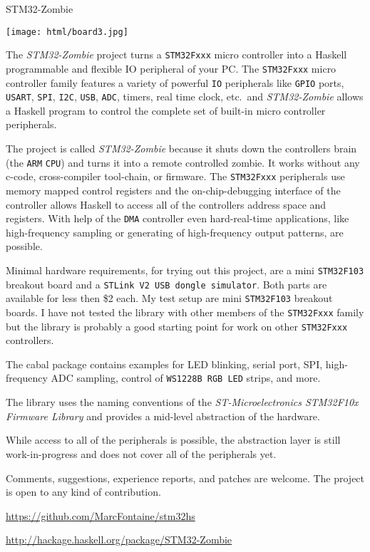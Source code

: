 \begin{hcarentry}[new]{STM32-Zombie}
\makeheader

\begin{center}
\texttt{[image: html/board3.jpg]}
\end{center}

The {\em STM32-Zombie} project turns a \texttt{STM32Fxxx} micro controller
into a Haskell programmable and flexible IO peripheral of your PC. The
\texttt{STM32Fxxx} micro controller family features a variety of powerful
\texttt{IO} peripherals like \texttt{GPIO} ports, \texttt{USART},
\texttt{SPI}, \texttt{I2C}, \texttt{USB}, \texttt{ADC}, timers, real time
clock, etc.\, and {\em STM32-Zombie} allows a Haskell program to control the
complete set of built-in micro controller peripherals.

The project is called {\em STM32-Zombie} because it shuts down the controllers
brain (the \texttt{ARM} \texttt{CPU}) and turns it into a remote controlled
zombie. It works without any c-code, cross-compiler tool-chain, or firmware.
The \texttt{STM32Fxxx} peripherals use memory mapped control registers and the
on-chip-debugging interface of the controller allows Haskell to access all of
the controllers address space and registers. With help of the \texttt{DMA}
controller even hard-real-time applications, like high-frequency sampling or
generating of high-frequency output patterns, are possible.

Minimal hardware requirements, for trying out this project, are a mini
\texttt{STM32F103} breakout board and a \texttt{STLink V2 USB dongle
simulator}. Both parts are available for less then \$2 each. My test setup are
mini \texttt{STM32F103} breakout boards. I have not tested the library with
other members of the \texttt{STM32Fxxx} family but the library is probably a
good starting point for work on other \texttt{STM32Fxxx} controllers.

The cabal package contains examples for LED blinking, serial port, SPI,
high-frequency ADC sampling, control of \texttt{WS1228B RGB LED} strips, and
more.

The library uses the naming conventions of the {\em ST-Microelectronics
STM32F10x Firmware Library} and provides a mid-level abstraction of the
hardware.

While access to all of the peripherals is possible, the abstraction layer is
still work-in-progress and does not cover all of the peripherals yet.

Comments, suggestions, experience reports, and patches are welcome. The
project is open to any kind of contribution.

\FurtherReading
  {\small
\begin{compactitem}
\item\url{https://github.com/MarcFontaine/stm32hs}
\item\url{http://hackage.haskell.org/package/STM32-Zombie}
\end{compactitem}
  }
\end{hcarentry}
